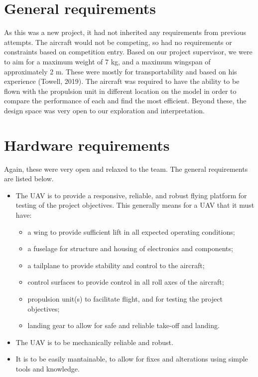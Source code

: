 \documentclass[../../main.tex]{subfiles}
\begin{document}

\section{General requirements} \label{sec:design-specification:general-requirements}

As this was a new project, it had not inherited any requirements from previous attempts. 
The aircraft would not be competing, so had no requirements or constraints based on competition entry. 
Based on our project supervisor, we were to aim for a maximum weight of 7 kg, and a maximum wingspan of approximately 2 m.
These were mostly for transportability and based on his experience (Towell, 2019).  %
The aircraft was required to have the ability to be flown with the propulsion unit in different location on the model in order to compare the performance of each and find the most efficient. 
Beyond these, the design space was very open to our exploration and interpretation. 

\section{Hardware requirements} \label{sec:design-specification:hardware-requirements}

Again, these were very open and relaxed to the team.
The general requirements are listed below.

\begin{itemize}
    \item The UAV is to provide a responsive, reliable, and robust flying platform for testing of the project objectives.
        This generally means for a UAV that it must have:
        \begin{itemize}
            \item a wing to provide sufficient lift in all expected operating conditions;
            \item a fuselage for structure and housing of electronics and components;
            \item a tailplane to provide stability and control to the aircraft;
            \item control surfaces to provide control in all roll axes of the aircraft;
            \item propulsion unit(s) to facilitate flight, and for testing the project objectives;
            \item landing gear to allow for safe and reliable take-off and landing.
        \end{itemize}
    \item The UAV is to be mechanically reliable and robust.
    \item It is to be easily mantainable, to allow for fixes and alterations using simple tools and knowledge.
\end{itemize}
\end{document}
